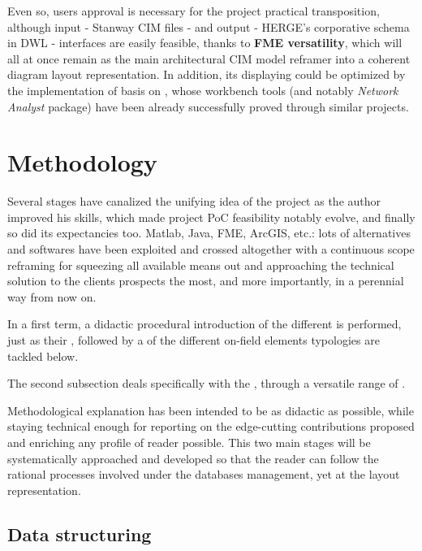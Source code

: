 Even so, users approval is necessary for the project practical transposition, although input - Stanway CIM files - and output - HERGE's corporative schema in DWL - interfaces are easily feasible, thanks to \textbf{FME versatility}, which will all at once remain as the main architectural CIM model reframer into a coherent diagram layout representation. In addition, its displaying could be optimized by the implementation of  basis on \textbf{}, whose workbench tools (and notably \textit{Network Analyst} package) have been already successfully proved through similar projects.

\section{Methodology}
\label{sec:AIG:methodology}

Several stages have canalized the unifying idea of the project as the author improved his skills, which made project PoC feasibility notably evolve, and finally so did its expectancies too. Matlab, Java, FME, ArcGIS, etc.: lots of alternatives and softwares have been exploited and crossed altogether with a continuous scope reframing for squeezing all available means out and approaching the technical solution to the clients prospects the most, and more importantly, in a perennial way from now on.

In a first term, a didactic procedural introduction  of the different  is performed, just as their , followed by a  of the different on-field elements typologies are tackled below.

The second subsection deals specifically with the , through a versatile range of .

Methodological explanation has been intended to be as didactic as possible, while staying technical enough for reporting on the edge-cutting contributions proposed and enriching any profile of reader possible. This two main stages will be systematically approached and developed so that the reader can follow the rational processes involved under the databases management, yet at the layout representation.

\subsection{Data structuring}
\label{sec:intro:AIG:structurisation}

